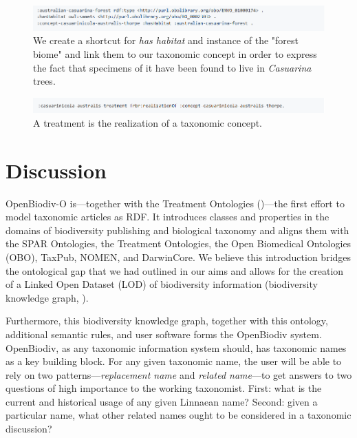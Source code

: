 \begin{figure}[h!]
\centering
  \includegraphics[width=\textwidth]{Figures/example-envo.png}
  \decoRule
  \caption[Example of combining ENVO with OpenBiodiv-O.]{We create a shortcut for \emph{has habitat} and instance of the "forest biome" and link them to our taxonomic concept in order to express the fact that specimens of it have been found to live in \emph{Casuarina} trees.}
  \label{example-envo}
\end{figure}



\begin{figure}[h!]
\centering
  \includegraphics[width=\textwidth]{Figures/example-treatment-concept}
  \decoRule
  \caption[Example connection between a treatment and a taxonomic concept.]{A treatment is the realization of a taxonomic concept.}
  \label{example-treatment-concept}
\end{figure}

\section{Discussion}

OpenBiodiv-O is---together with the Treatment Ontologies (\cite{catapano_treatment_2016})---the first effort to model taxonomic articles as RDF. It introduces classes and properties in the domains of biodiversity publishing and biological taxonomy and aligns them with the SPAR Ontologies, the Treatment Ontologies, the Open Biomedical Ontologies (OBO), TaxPub, NOMEN, and DarwinCore. We believe this introduction bridges the ontological gap that we had outlined in our aims and allows for the creation of a Linked Open Dataset (LOD) of biodiversity information (biodiversity knowledge graph, \cite{senderov_open_2016, page_towards_2016}).

Furthermore, this biodiversity knowledge graph, together with this ontology, additional semantic rules, and user software forms the OpenBiodiv system. OpenBiodiv, as any taxonomic information system should, has taxonomic names as a key building block. For any given taxonomic name, the user will be able to rely on two patterns---\emph{replacement name} and \emph{related name}---to get answers to two questions of high importance to the working taxonomist. First: what is the current and historical usage of any given Linnaean name? Second: given a particular name, what other related names ought to be considered in a taxonomic discussion?


